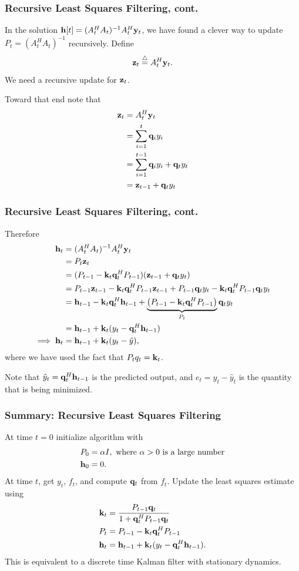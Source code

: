 \documentclass{beamer}
\begin{document}
\begin{frame}\frametitle{Recursive Least Squares Filtering, cont.}
		In the solution $\mathbf{h}[t] = (A_t^H A_t)^{-1} A_t^H \mathbf{y}_t$, we have found a clever way to update $P_t=(A_t^H A_t)^{-1}$ recursively.  Define
		\[
		\mathbf{z}_t \stackrel{\triangle}{=} A_t^H \mathbf{y}_t.
		\]
		We need a recursive update for $\mathbf{z}_t$.
		
		Toward that end note that
		\begin{align*}
			\mathbf{z}_t &= A_t^H \mathbf{y}_t \\
			 	&= \sum_{i=1}^t \mathbf{q}_i y_i \\
			 	&= \sum_{i=1}^{t-1} \mathbf{q}_i y_i + \mathbf{q}_t y_t \\
				&= \mathbf{z}_{t-1} + \mathbf{q}_t y_t
		\end{align*}
\end{frame}

\begin{frame}\frametitle{Recursive Least Squares Filtering, cont.}
	Therefore
	\begin{align*}
		\mathbf{h}_t	&= (A_t^H A_t)^{-1} A_t^H \mathbf{y}_t \\
				&= P_t \mathbf{z}_t \\
				&= (P_{t-1} - \mathbf{k}_t \mathbf{q}_t^H P_{t-1})(\mathbf{z}_{t-1} + \mathbf{q}_t y_t)\\
				&= P_{t-1} \mathbf{z}_{t-1} - \mathbf{k}_t \mathbf{q}_t^H P_{t-1} \mathbf{z}_{t-1} + P_{t-1} \mathbf{q}_t y_t - \mathbf{k}_t \mathbf{q}_t^H P_{t-1} \mathbf{q}_t y_t\\
				&= \mathbf{h}_{t-1} - \mathbf{k}_t \mathbf{q}_t^H \mathbf{h}_{t-1} + \underbrace{\left( P_{t-1}-\mathbf{k}_t \mathbf{q}_t^H P_{t-1} \right)}_{P_t} \mathbf{q}_t y_t \\
				&= \mathbf{h}_{t-1} + \mathbf{k}_t(y_t - \mathbf{q}_t^H \mathbf{h}_{t-1}) \\
		\implies \mathbf{h}_t &= \mathbf{h}_{t-1} + \mathbf{k}_t(y_t - \hat{y}),
	\end{align*}
	where we have used the fact that $P_t q_t = \mathbf{k}_t$.

	Note that $\hat{y}_t = \mathbf{q}_t^H \mathbf{h}_{t-1}$ is the predicted output, and $e_t=y_t-\hat{y}_t$ is the quantity that is being minimized.
\end{frame}

\begin{frame}\frametitle{Summary: Recursive Least Squares Filtering}
	At time $t=0$ initialize algorithm with
	\begin{align*}
		P_0 &= \alpha I, \text{~where $\alpha>0$ is a large number} \\
		\mathbf{h}_0 &= 0.
	\end{align*}
	At time $t$, get $y_t$, $f_t$, and compute $\mathbf{q}_t$ from $f_t$.  Update the least squares estimate using  
	\begin{align*}
  		\mathbf{k}_t &= \frac{P_{t-1} \mathbf{q}_t}{1 + \mathbf{q}_t^H P_{t-1} \mathbf{q}_t} \\
  		P_t &= P_{t-1} - \mathbf{k}_t \mathbf{q}_t^H P_{t-1} \\
  		\mathbf{h}_t &= \mathbf{h}_{t - 1} + \mathbf{k}_t (y_t - \mathbf{q}_t^H \mathbf{h}_{t-1}).
	\end{align*}
This is equivalent to a discrete time Kalman filter with stationary dynamics.
	
\end{frame}
\end{document}
